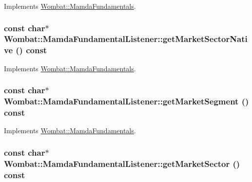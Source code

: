 Implements \hyperlink{classWombat_1_1MamdaFundamentals_e72366f03a1ddcaa3d0e75fafaaddf60}{Wombat::Mamda\-Fundamentals}.\hypertarget{classWombat_1_1MamdaFundamentalListener_5451ffdbcd4d4833e7fce5e19d2a3282}{
\subsubsection[getMarketSectorNative]{\setlength{\rightskip}{0pt plus 5cm}const char$\ast$ Wombat::Mamda\-Fundamental\-Listener::get\-Market\-Sector\-Native () const}}
\label{classWombat_1_1MamdaFundamentalListener_5451ffdbcd4d4833e7fce5e19d2a3282}




Implements \hyperlink{classWombat_1_1MamdaFundamentals_185d4ae26f9a5f362b01dff364f9c9ee}{Wombat::Mamda\-Fundamentals}.\hypertarget{classWombat_1_1MamdaFundamentalListener_7f2643689fe51a96a052eebcc6d50e9a}{
\subsubsection[getMarketSegment]{\setlength{\rightskip}{0pt plus 5cm}const char$\ast$ Wombat::Mamda\-Fundamental\-Listener::get\-Market\-Segment () const}}
\label{classWombat_1_1MamdaFundamentalListener_7f2643689fe51a96a052eebcc6d50e9a}




Implements \hyperlink{classWombat_1_1MamdaFundamentals_f96bd6fe7c76ce21ccebff0e1090ab4e}{Wombat::Mamda\-Fundamentals}.\hypertarget{classWombat_1_1MamdaFundamentalListener_11041dcd12c8969eebdd41e6f96afed8}{
\subsubsection[getMarketSector]{\setlength{\rightskip}{0pt plus 5cm}const char$\ast$ Wombat::Mamda\-Fundamental\-Listener::get\-Market\-Sector () const}}
\label{classWombat_1_1MamdaFundamentalListener_11041dcd12c8969eebdd41e6f96afed8}




